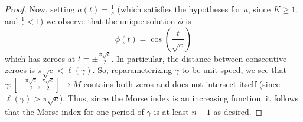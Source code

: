 \documentclass[fontsize=11pt]{scrartcl} %
\numberwithin{equation}{section} %
\numberwithin{figure}{section} %
\numberwithin{table}{section} %
\begin{document}
\begin{proof}
    Now, setting $a(t) = \frac{1}{c}$ (which satisfies the hypotheses for $a$,
    since $K\geq 1$, and $\frac{1}{c}<1$) we observe that the unique solution
    $\phi$ is
    \[
    \phi(t) = \cos(\frac{t}{\sqrt{c}})
    \]
    which has zeroes at $t = \pm\frac{\pi\sqrt{c}}{2}$. In particular, the
    distance between consecutive zeroes is $\pi\sqrt{c}<\ell(\gamma)$. So,
    reparameterizing $\gamma$ to be unit speed, we see that
    $\gamma:[-\frac{\pi\sqrt{c}}{2},\frac{\pi\sqrt{c}}{2}]\to M$ contains both
    zeros and does not intersect itself (since $\ell(\gamma)>\pi\sqrt{c}$).
    Thus, since the Morse index is an increasing function, it follows that the
    Morse index for one period of $\gamma$ is at least $n-1$ as desired.
\end{proof}
\end{document}
